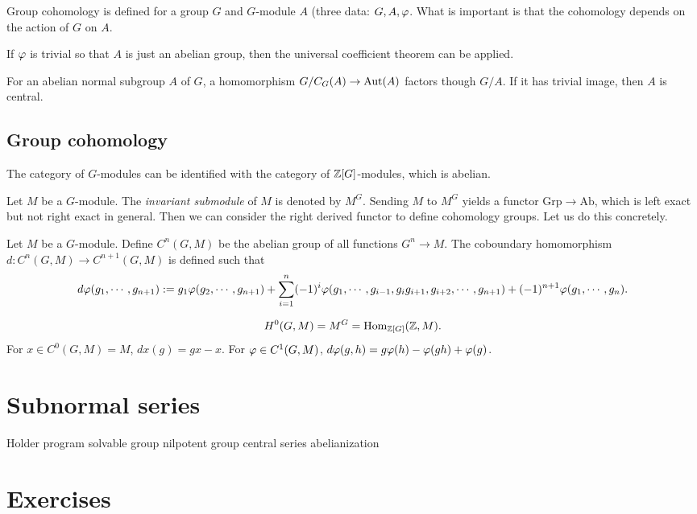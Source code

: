 \documentclass{../../large}
\begin{document}
Group cohomology is defined for a group $G$ and $G$-module $A$ (three data: $G,A,\varphi$.
What is important is that the cohomology depends on the action of $G$ on $A$.

If $\varphi$ is trivial so that $A$ is just an abelian group, then the universal coefficient theorem can be applied.




\begin{prb}
For an abelian normal subgroup $A$ of $G$, a homomorphism $G/C_G(A)\to\operatorname{Aut}(A)$ factors though $G/A$.
If it has trivial image, then $A$ is central.
\end{prb}



\subsection*{Group cohomology}

The category of $G$-modules can be identified with the category of $\mathbb{Z}[G]$-modules, which is abelian.


Let $M$ be a $G$-module.
The \emph{invariant submodule} of $M$ is denoted by $M^G$.
Sending $M$ to $M^G$ yields a functor $\mathrm{Grp}\to\mathrm{Ab}$, which is left exact but not right exact in general.
Then we can consider the right derived functor to define cohomology groups.
Let us do this concretely.


Let $M$ be a $G$-module.
Define $C^n(G,M)$ be the abelian group of all functions $G^n\to M$.
The coboundary homomorphism $d:C^n(G,M)\to C^{n+1}(G,M)$ is defined such that
\[d\varphi(g_1,\cdots,g_{n+1}):=g_1\varphi(g_2,\cdots,g_{n+1})+\sum_{i=1}^n(-1)^i\varphi(g_1,\cdots,g_{i-1},g_ig_{i+1},g_{i+2},\cdots,g_{n+1})+(-1)^{n+1}\varphi(g_1,\cdots,g_n).\]

\[H^0(G,M)=M^G=\operatorname{Hom}_{\mathbb{Z}[G]}(\mathbb{Z},M).\]
For $x\in C^0(G,M)=M$, $dx(g)=gx-x$.
For $\varphi\in C^1(G,M)$, $d\varphi(g,h)=g\varphi(h)-\varphi(gh)+\varphi(g)$.


\section{Subnormal series}

Holder program
solvable group
nilpotent group
central series
abelianization

\section*{Exercises}
\begin{prb}
\end{prb}
\end{document}
